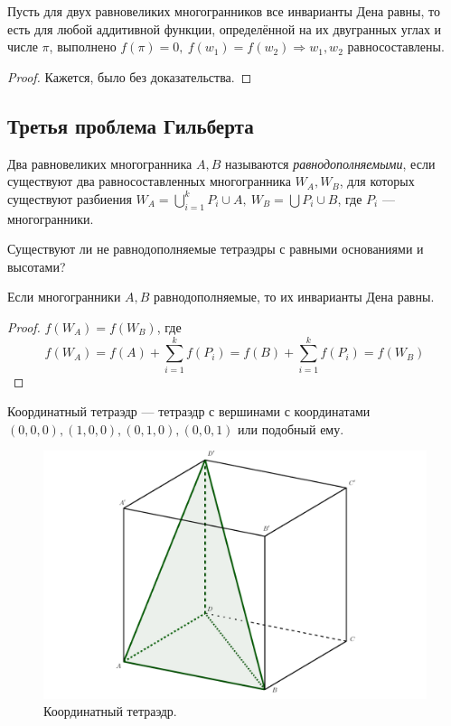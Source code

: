\begin{theorem}[Сидлер]
    Пусть для двух равновеликих многогранников все инварианты Дена равны, то есть для любой аддитивной функции, определённой на их двугранных углах и числе $\pi$, выполнено $f(\pi) = 0, \ f(w_1) = f(w_2) \Rightarrow w_1, w_2$ равносоставлены.
\end{theorem}
\begin{proof}
    Кажется, было без доказательства.
\end{proof} 

\subsection{Третья проблема Гильберта}
\begin{definition}
    Два равновеликих многогранника $A, B$ называются \textit{равнодополняемыми}, если существуют два равносоставленных многогранника $W_A, W_B$, для которых существуют разбиения $W_A = \bigcup_{i = 1}^k P_i \cup A, \ W_B = \bigcup P_i \cup B$, где $P_i$ — многогранники.
\end{definition}

\begin{theorem}
    Существуют ли не равнодополняемые тетраэдры с равными основаниями и высотами?
\end{theorem}

\begin{statement}
    Если многогранники $A,B$ равнодополняемые, то их инварианты Дена равны.
\end{statement}
\begin{proof}
    $f(W_A) = f(W_B)$, где $$f(W_A) = f(A) + \sum_{i = 1}^{k} f(P_i) = f(B) + \sum_{i = 1}^{k} f(P_i) = f(W_B)$$
\end{proof}

\begin{definition}
    Координатный тетраэдр — тетраэдр с вершинами с координатами $(0,0,0), (1,0,0), (0,1,0), (0,0,1)$ или подобный ему.
\end{definition} 

\begin{figure}[htbp]
    \centering
    \includegraphics[scale=0.2]{images/c9.7.png}
    \caption{Координатный тетраэдр.}
    \label{fig:c9.7}
\end{figure}

